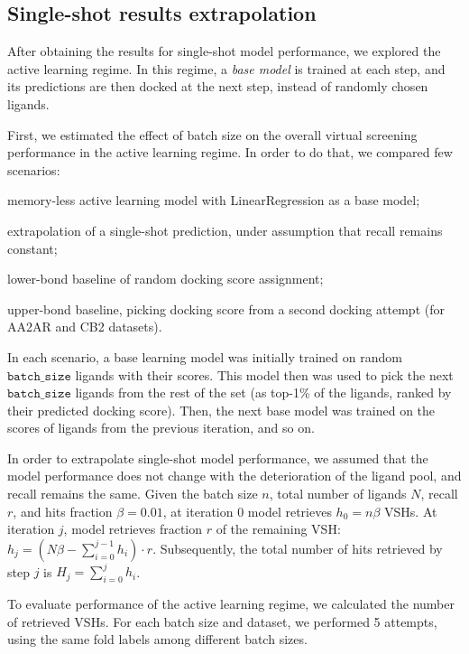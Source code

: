 \subsection{Single-shot results extrapolation}

After obtaining the results for single-shot model performance, we explored the active learning regime. In this regime, a \textit{base model} is trained at each step, and its predictions are then docked at the next step, instead of randomly chosen ligands. 

First, we estimated the effect of batch size on the overall virtual screening performance in the active learning regime. In order to do that, we compared few scenarios: 
\begin{enumerate*}[label=(\roman*)]
    \item memory-less active learning model with LinearRegression as a base model;
    \item extrapolation of a single-shot prediction, under assumption that recall remains constant;
    \item lower-bond baseline of random docking score assignment;
    \item upper-bond baseline, picking docking score from a second docking attempt (for AA2AR and CB2 datasets).
\end{enumerate*}

In each scenario, a base learning model was initially trained on random $\texttt{batch\_size}$ ligands with their scores. This model then was used to pick the next $\texttt{batch\_size}$ ligands from the rest of the set (as top-1\% of the ligands, ranked by their predicted docking score). Then, the next base model was trained on the scores of ligands from the previous iteration, and so on.

In order to extrapolate single-shot model performance, we assumed that the model performance does not change with the deterioration of the ligand pool, and recall remains the same. Given the batch size $n$, total number of ligands $N$, recall $r$, and hits fraction $\beta=0.01$, at iteration 0 model retrieves $h_0 = n\beta$ VSHs. At iteration $j$, model retrieves fraction $r$ of the remaining VSH: $h_j = ( N\beta - \sum_{i=0}^{j-1}h_i ) \cdot r$. Subsequently, the total number of hits retrieved by step $j$ is $H_j = \sum_{i=0}^{j} h_i$.

To evaluate performance of the active learning regime, we calculated the number of retrieved VSHs. For each batch size and dataset, we performed 5 attempts, using the same fold labels among different batch sizes.

